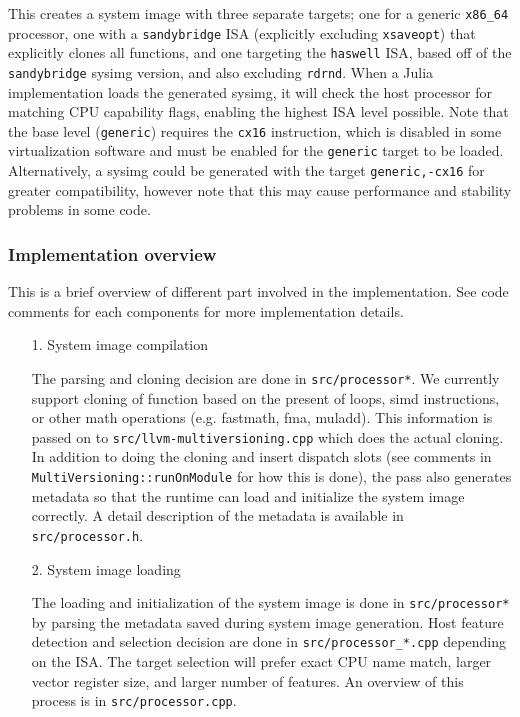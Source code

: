 This creates a system image with three separate targets; one for a generic \texttt{x86\_64} processor, one with a \texttt{sandybridge} ISA (explicitly excluding \texttt{xsaveopt}) that explicitly clones all functions, and one targeting the \texttt{haswell} ISA, based off of the \texttt{sandybridge} sysimg version, and also excluding \texttt{rdrnd}.  When a Julia implementation loads the generated sysimg, it will check the host processor for matching CPU capability flags, enabling the highest ISA level possible.  Note that the base level (\texttt{generic}) requires the \texttt{cx16} instruction, which is disabled in some virtualization software and must be enabled for the \texttt{generic} target to be loaded.  Alternatively, a sysimg could be generated with the target \texttt{generic,-cx16} for greater compatibility, however note that this may cause performance and stability problems in some code.



\hypertarget{6161913736473072394}{}


\subsubsection{Implementation overview}



This is a brief overview of different part involved in the implementation. See code comments for each components for more implementation details.



\begin{itemize}
\item[1. ] System image compilation

The parsing and cloning decision are done in \texttt{src/processor*}.  We currently support cloning of function based on the present of loops, simd instructions,  or other math operations (e.g. fastmath, fma, muladd).  This information is passed on to \texttt{src/llvm-multiversioning.cpp} which does the actual cloning.  In addition to doing the cloning and insert dispatch slots  (see comments in \texttt{MultiVersioning::runOnModule} for how this is done),  the pass also generates metadata so that the runtime can load and initialize the  system image correctly.  A detail description of the metadata is available in \texttt{src/processor.h}.


\item[2. ] System image loading

The loading and initialization of the system image is done in \texttt{src/processor*} by  parsing the metadata saved during system image generation.  Host feature detection and selection decision are done in \texttt{src/processor\_*.cpp}  depending on the ISA. The target selection will prefer exact CPU name match,  larger vector register size, and larger number of features.  An overview of this process is in \texttt{src/processor.cpp}.

\end{itemize}


